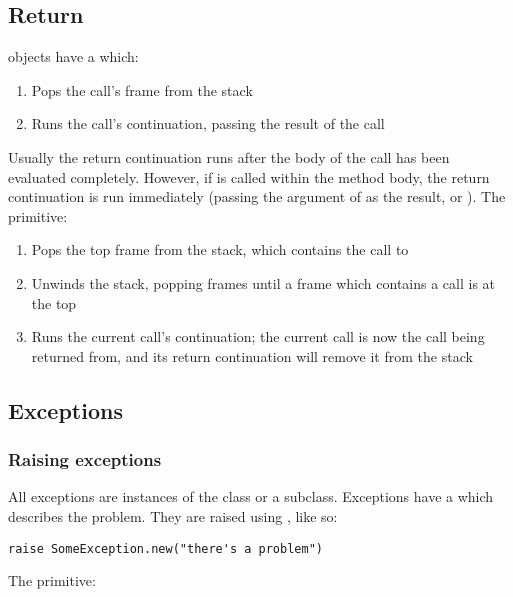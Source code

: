 \subsection{Return}

 objects have a  which:

\begin{enumerate}
  \item Pops the call's frame from the stack
  \item Runs the call's continuation, passing the result of the call
\end{enumerate}

Usually the return continuation runs after the body of the call has been evaluated completely. However, if  is called within the method body, the return continuation is run immediately (passing the argument of  as the result, or ). The  primitive:

\begin{enumerate}
  \item Pops the top frame from the stack, which contains the call to 
  \item Unwinds the stack, popping frames until a frame which contains a call is at the top
  \item Runs the current call's continuation; the current call is now the call being returned from, and its return continuation will remove it from the stack
\end{enumerate}

\subsection{Exceptions}
\label{sec:exceptions}

\subsubsection{Raising exceptions}

All exceptions are instances of the  class or a subclass. Exceptions have a  which describes the problem. They are raised using , like so:

\begin{lstlisting}
raise SomeException.new("there's a problem")
\end{lstlisting}

The  primitive:

